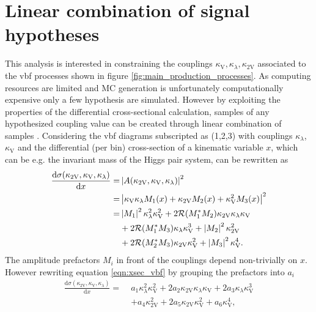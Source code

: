 \section{Linear combination of signal hypotheses}\label{sec:linear_combination}
\newcommand{\kl}{\kappa_\lambda}
\newcommand{\kt}{\kappa_t}
\newcommand{\kvv}{\kappa_\text{2V}}
\newcommand{\kv}{\kappa_\text{V}}
\newcommand{\mhh}{m_\text{HH}}

This analysis is interested in constraining the couplings $\kappa_\text{V},\kappa_\lambda,\kappa_\text{2V}$ associated to the \ac{vbf} processes shown in figure \ref{fig:main_production_processes}. As computing resources are limited and MC generation is unfortunately computationally expensive only a few hypothesis are simulated. However by exploiting the properties of the differential cross-sectional calculation, samples of any hypothesized coupling value can be created through linear combination of samples \citep{ATLAS-CONF-2019-049}. Considering the \ac{vbf} diagrams subscripted as (1,2,3) with couplings $\kl$, $\kv$ and \ktwov the differential (per bin) cross-section of a kinematic variable $x$, which can be e.g. the invariant mass of the Higgs pair system, can be rewritten as
\begin{align}
    \label{eqn:xsec_vbf}
    \frac{\mathrm{d}\sigma(\kvv, \kv, \kl )}{\mathrm{d} x } = &
    \left| A(\kvv, \kv, \kl ) \right|^2                                                                                               \\ \nonumber
    =                                                         & \left| \kv \kl M_1(x    ) + \kvv M_2(x  ) + \kv^2 M_3(x   ) \right|^2 \\ \nonumber
    =                                                         & \abs{M_1}^2 \kl^2 \kv^2  + 2 \mathcal{R}(M_{1}^* M_{2})  \kvv \kl \kv \\ \nonumber
                                                              & + 2 \mathcal{R}(M_{1}^* M_{3}) \kl \kv^3 + \abs{M_2}^2  \kvv^2        \\ \nonumber
                                                              & + 2 \mathcal{R}(M_{2}^* M_{3}) \kvv \kv^2 + \abs{M_3}^2 \kv^4.
\end{align}
The amplitude prefactors $M_i$ in front of the couplings depend non-trivially on $x$. However
rewriting equation \ref{eqn:xsec_vbf} by grouping the prefactors into $a_i$
\begin{align}\label{eq:reweight}
    \frac{\mathrm{d}\sigma(\kvv, \kv, \kl )}{\mathrm{d} x}
    = \; & a_1 \kl^2 \kv^2  + 2 a_2 \kvv \kl \kv  + 2 a_3 \kl \kv^3  \\
         & + a_4 \kvv^2     + 2 a_5 \kvv \kv^2 + a_6\kv^4, \nonumber
\end{align}
